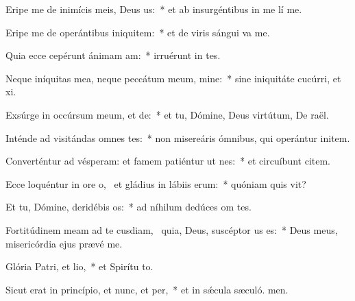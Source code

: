 \item Eripe me de inimícis meis, Deus us:~* et ab insurgéntibus in me lí me.
\item Eripe me de operántibus iniquitem:~* et de viris sángui va me.
\item Quia ecce cepérunt ánimam am:~* irruérunt in  tes.
\item Neque iníquitas mea, neque peccátum meum, mine:~* sine iniquitáte cucúrri, et xi.
\item Exsúrge in occúrsum meum, et de:~* et tu, Dómine, Deus virtútum, De raël.
\item Inténde ad visitándas omnes tes:~* non misereáris ómnibus, qui operántur initem.
\item Converténtur ad vésperam: et famem patiéntur ut nes:~* et circuíbunt citem.
\item Ecce loquéntur in ore o,~\pscross{} et gládius in lábiis erum:~* quóniam quis vit?
\item Et tu, Dómine, deridébis os:~* ad níhilum dedúces om tes.
\item Fortitúdinem meam ad te cusdiam,~\pscross{} quia, Deus, suscéptor us es:~* Deus meus, misericórdia ejus prævé me.
\item Glória Patri, et lio,~* et Spirítu to.
\item Sicut erat in princípio, et nunc, et per,~* et in sǽcula sæculó. men.
